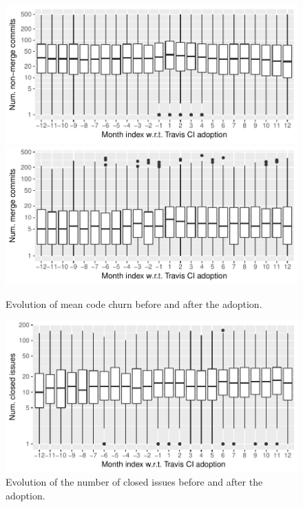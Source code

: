 \begin{figure}[t]
\centering
\includegraphics[width=\columnwidth, clip=true, trim=0 0 0 0]{figures/freq-non-merge.pdf}
\includegraphics[width=\columnwidth, clip=true, trim=0 0 0 0]{figures/freq-merge.pdf}
\caption{Evolution of mean code churn before and after the \Tvis adoption.}
\label{fig:freq}
\end{figure}

\begin{figure}[t]
\centering
\includegraphics[width=\columnwidth, clip=true, trim=0 0 0 0]{figures/issues.pdf}
\caption{Evolution of the number of closed issues before and after the \Tvis adoption.}
\label{fig:issues}
\end{figure}

